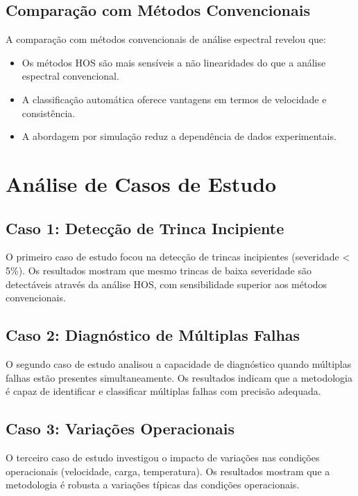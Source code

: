 \subsection{Comparação com Métodos Convencionais}

A comparação com métodos convencionais de análise espectral revelou que:

\begin{itemize}
    \item Os métodos HOS são mais sensíveis a não linearidades do que a análise espectral convencional.
    \item A classificação automática oferece vantagens em termos de velocidade e consistência.
    \item A abordagem por simulação reduz a dependência de dados experimentais.
\end{itemize}

\section{Análise de Casos de Estudo}

\subsection{Caso 1: Detecção de Trinca Incipiente}

O primeiro caso de estudo focou na detecção de trincas incipientes (severidade < 5\%). Os resultados mostram que mesmo trincas de baixa severidade são detectáveis através da análise HOS, com sensibilidade superior aos métodos convencionais.

\subsection{Caso 2: Diagnóstico de Múltiplas Falhas}

O segundo caso de estudo analisou a capacidade de diagnóstico quando múltiplas falhas estão presentes simultaneamente. Os resultados indicam que a metodologia é capaz de identificar e classificar múltiplas falhas com precisão adequada.

\subsection{Caso 3: Variações Operacionais}

O terceiro caso de estudo investigou o impacto de variações nas condições operacionais (velocidade, carga, temperatura). Os resultados mostram que a metodologia é robusta a variações típicas das condições operacionais.

